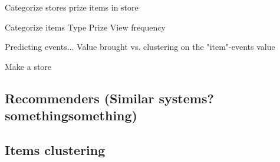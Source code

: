 Categorize stores
    prize
    items in store

Categorize items
    Type
    Prize
    View frequency

Predicting events...
    Value brought vs. clustering on the "item"-events value

Make a store















\subsection{Recommenders (Similar systems? somethingsomething)}
\subsection{Items clustering}





